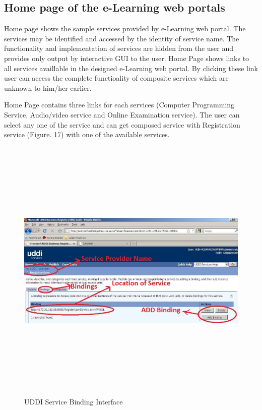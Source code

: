 \subsection{Home page of the e-Learning web portals}
Home page shows the sample services provided by e-Learning web portal. The services may be identified and accessed by the identity of service name. The functionality and implementation  of services are hidden from the user and provides only output by interactive GUI to the user. Home Page shows links to all services availlable
in the designed e-Learning web portal. By clicking these link user can access the complete functioality of composite services which are unknown to him/her earlier.\par
Home Page contains three links for each services (Computer Programming Service, Audio/video service and Online Examination service).
The user can select any one of the service and can get composed service with Registration service (Figure. 17) with one of the available services.
\begin{figure}[h!]
 \centering
 \includegraphics[width=16cm,height=13cm]{uddi_service_binding_interface.jpg}
 \caption{UDDI Service Binding Interface}
\end{figure} 
